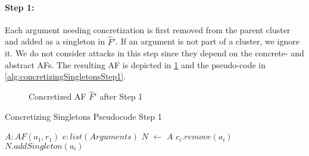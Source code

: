 \paragraph{Step 1:} Each argument needing concretization is first removed from the parent cluster and added as a singleton in $\hat{F}'$.
If an argument is not part of a cluster, we ignore it.
We do not consider attacks in this step since they depend on the concrete- and abstract AFs. The resulting AF is depicted in \cref{example:algorithmConcretizeSingletonsStep1} and the pseudo-code in \cref{alg:concretizingSingletonsStep1}.


\vspace{0.3cm}
\begin{figure}[h]
    \centering
    \caption{Concretized AF $\hat{F}'$ after Step 1}
    \label{example:algorithmConcretizeSingletonsStep1}
\end{figure}
\vspace{-0.2cm}


\begin{algorithm}[H]
    \caption{Concretizing Singletons Pseudocode Step 1}\label{alg:concretizingSingletonsStep1}
    \begin{algorithmic}[1]
        \Require $A: AF(a_1, r_1)$ 
        \Require $e: list(Arguments)$ 
        \State $N$ $\gets$ $A$ 
                    \State $c_i.remove(a_i)$
                \EndIf
                \EndFor
            \State $N.addSingleton(a_i)$
        \EndFor
    \end{algorithmic}
\end{algorithm}





